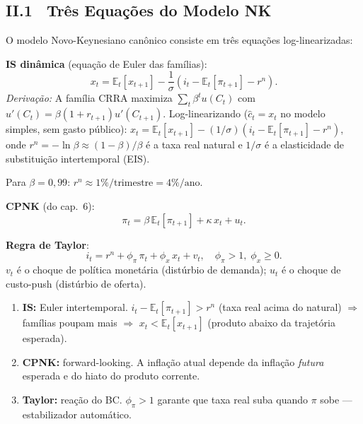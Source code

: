 \documentclass[12pt, a4paper]{article}
\newcommand{\E}{\mathbb{E}}
\begin{document}
\subsection*{II.1 \ Três Equações do Modelo NK}

O modelo Novo-Keynesiano canônico consiste em três equações log-linearizadas:

\textbf{IS dinâmica} (equação de Euler das famílias):
\begin{equation}
x_t = \E_t[x_{t+1}] - \frac{1}{\sigma}(i_t - \E_t[\pi_{t+1}] - r^n).
\label{eq:is_nk}
\end{equation}
\textit{Derivação:} A família CRRA maximiza $\sum_t \beta^t u(C_t)$ com
$u'(C_t) = \beta(1+r_{t+1})u'(C_{t+1})$. Log-linearizando ($\hat{c}_t = x_t$ no
modelo simples, sem gasto público):
$x_t = \E_t[x_{t+1}] - (1/\sigma)(i_t - \E_t[\pi_{t+1}] - r^n)$,
onde $r^n = -\ln\beta \approx (1-\beta)/\beta$ é a taxa real natural e $1/\sigma$
é a elasticidade de substituição intertemporal (EIS).

Para $\beta=0{,}99$: $r^n \approx 1\%/\text{trimestre} = 4\%/\text{ano}$.

\textbf{CPNK} (do cap.\ 6):
\begin{equation}
\pi_t = \beta\,\E_t[\pi_{t+1}] + \kappa\,x_t + u_t.
\label{eq:cpnk_nk}
\end{equation}

\textbf{Regra de Taylor}:
\begin{equation}
i_t = r^n + \phi_\pi\,\pi_t + \phi_x\,x_t + v_t, \quad \phi_\pi > 1,\;\phi_x \geq 0.
\label{eq:taylor_nk}
\end{equation}
$v_t$ é o choque de política monetária (distúrbio de demanda);
$u_t$ é o choque de custo-push (distúrbio de oferta).

\begin{resultbox}[title={Interpretação das três equações}]
\begin{enumerate}[leftmargin=1.5em, itemsep=3pt]
  \item \textbf{IS:} Euler intertemporal. $i_t - \E_t[\pi_{t+1}] > r^n$
    (taxa real acima do natural) $\Rightarrow$ famílias poupam mais $\Rightarrow$
    $x_t < \E_t[x_{t+1}]$ (produto abaixo da trajetória esperada).
  \item \textbf{CPNK:} forward-looking. A inflação atual depende da inflação
    \emph{futura} esperada e do hiato do produto corrente.
  \item \textbf{Taylor:} reação do BC. $\phi_\pi > 1$ garante que taxa real suba
    quando $\pi$ sobe --- estabilizador automático.
\end{enumerate}
\end{resultbox}
\end{document}

